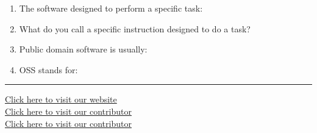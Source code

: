 \documentclass[11pt,a4paper]{article}
\begin{document}
\begin{enumerate}[label=\arabic*.,leftmargin=*,itemsep=8pt]
  \item The software designed to perform a specific task:
  
  \item What do you call a specific instruction designed to do a task?
  
  \item Public domain software is usually:
  
  \item OSS stands for:
  
\end{enumerate}

\vfill
\rule{\linewidth}{0.4pt}

\begin{center}\small
\href{https://bhu-exam.vercel.app/}{Click here to visit our website}\\[4pt]\href{https://me-aryan.vercel.app/}{Click here to visit our contributor}\\[4pt]\href{https://quashan-me.vercel.app/}{Click here to visit our contributor}
\end{center}
\end{document}
